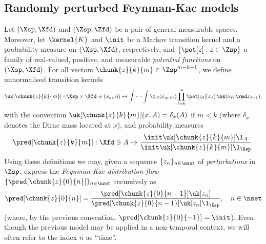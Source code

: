 \subsection{Randomly perturbed Feynman-Kac models} 
\label{sec:Feynman:Kac:models}
Let $(\Xsp, \Xfd)$ and $(\Zsp, \Zfd)$ be a pair of general measurable spaces. Moreover, let $\kernel{K}$ and $\init$ be a Markov transition kernel and a probability measure on $(\Xsp, \Xfd)$, respectively, and $\{ \pot[z] : z \in \Zsp \}$ a family of real-valued, positive, and measurable \emph{potential functions} on $(\Xsp, \Xfd)$. For  all vectors $\chunk{z}{k}{m} \in \Zsp^{m - k + 1}$, we define unnormalised transition kernels
$$
    \uk[\chunk{z}{k}{m}] : \Xsp \times \Xfd \ni (x_k, A) 
    \mapsto \idotsint \1_A(x_{m + 1}) \prod_{\ell = k}^m 
    \pot[z_\ell](x_\ell) \, \mk(x_\ell, \rmd x_{\ell + 1}),
$$
with the convention $\uk[\chunk{z}{k}{m}](x, A) = \delta_x(A)$ if $m < k$ (where $\delta_x$ denotes the Dirac mass located at $x$),  
and probability measures 
\begin{equation} \label{eq:def:pred}
    \pred[\chunk{z}{k}{m}] : \Xfd \ni A 
    \mapsto \frac{\init \uk[\chunk{z}{k}{m}] \1_A}
    {\init \uk[\chunk{z}{k}{m}] \1_\Xsp}. 
\end{equation}
Using these definitions we may, given a sequence $\{ z_n \}_{n \in \nset}$ of \emph{perturbations} in $\Zsp$, express the \emph{Feynman-Kac distribution flow} $\{ \pred[\chunk{z}{0}{n}] \}_{n \in \nset}$ recursively as 
\begin{equation} \label{eq:pred:rec}
    \pred[\chunk{z}{0}{n}] 
    = \frac{\pred[\chunk{z}{0}{n - 1}] \uk[z_n]}{\pred[\chunk{z}{0}{n - 1}]  \uk[z_n] \1_\Xsp}, \quad n \in \nset 
\end{equation}
(where, by the previous convention, $\pred[\chunk{z}{0}{- 1}] = \init$). Even though the previous model may be applied in a non-temporal context, we will often refer to the index $n$ as ``time''. 

